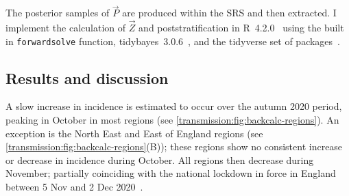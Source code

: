 \documentclass[thesis.tex]{subfiles}
\begin{document}
The posterior samples of $\vec{P}$ are produced within the SRS and then extracted.
I implement the calculation of $\vec{Z}$ and poststratification in R~4.2.0~\autocite{R-4-2-0} using the built in \texttt{forwardsolve} function, tidybayes~3.0.6~\autocite{tidybayes}, and the tidyverse set of packages~\autocite{tidyverse}.

\subsection{Results and discussion} \label{backcalc:sec:results}

A slow increase in incidence is estimated to occur over the autumn 2020 period, peaking in October in most regions (see \cref{transmission:fig:backcalc-regions}).
An exception is the North East and East of England regions (see \cref{transmission:fig:backcalc-regions}(B)); these regions show no consistent increase or decrease in incidence during October.
All regions then decrease during November; partially coinciding with the national lockdown in force in England between 5 Nov and 2 Dec 2020~\autocite{ifgTimeline}.
\end{document}
